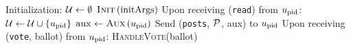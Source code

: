 \begin{algorithm}[H]
  \caption{$\gfunc\left(\textsc{Init}, \textsc{Aux},
  \textsc{HandleVote}\right)\left(\postlist, \mathrm{initArgs}\right)$}
  \label{alg:gfunc}
  \begin{algorithmic}[1]
    \State Initialization:
    \Indent
      \State $\mathcal{U} \gets \emptyset$ 
      \State $\textsc{Init}\left(\mathrm{initArgs}\right)$
    \EndIndent
    \State
    \State Upon receiving (\texttt{read}) from $u_{\mathrm{pid}}$:
    \State $\mathcal{U} \gets \mathcal{U} \cup \left\{u_{\mathrm{pid}}\right\}$
    \Indent
      \State $\mathrm{aux} \gets \textsc{Aux}\left(u_{\mathrm{pid}}\right)$
      \State Send (\texttt{posts}, $\mathcal{P}$, aux) to $u_{\mathrm{pid}}$
    \EndIndent
    \State
    \State Upon receiving (\texttt{vote}, ballot) from
    $u_{\mathrm{pid}}$:
     \Indent
       \State \textsc{HandleVote}(ballot)
     \EndIndent
  \end{algorithmic}
\end{algorithm}
